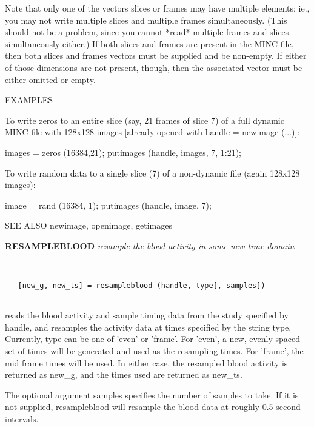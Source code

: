    Note that only one of the vectors slices or frames may have multiple
   elements; ie., you may not write multiple slices and multiple frames
   simultaneously.  (This should not be a problem, since you cannot *read*
   multiple frames and slices simultaneously either.)  If both slices
   and frames are present in the MINC file, then both slices and frames
   vectors must be supplied and be non-empty.  If either of those 
   dimensions are not present, though, then the associated vector must
   be either omitted or empty.  
 
   EXAMPLES
     
     To write zeros to an entire slice (say, 21 frames of slice 7) of
     a full dynamic MINC file with 128x128 images [already opened with
     handle = newimage (...)]:
 
       images = zeros (16384,21);
       putimages (handle, images, 7, 1:21);
 
     To write random data to a single slice (7) of a non-dynamic file 
     (again 128x128 images):
 
       image = rand (16384, 1);
       putimages (handle, image, 7);
 
   SEE ALSO  newimage, openimage, getimages
\endfunchelp


{\large\bf RESAMPLEBLOOD} {\em  resample the blood activity in some new time domain}
\begin{verbatim}


   [new_g, new_ts] = resampleblood (handle, type[, samples])


\end{verbatim}

   reads the blood activity and sample timing data from the study
   specified by handle, and resamples the activity data at times
   specified by the string type.  Currently, type can be one of 'even'
   or 'frame'.  For 'even', a new, evenly-spaced set of times will be
   generated and used as the resampling times.  For 'frame', the mid
   frame times will be used.  In either case, the resampled blood
   activity is returned as new\_g, and the times used are returned as
   new\_ts.
 
   The optional argument samples specifies the number of samples
   to take.  If it is not supplied, resampleblood will resample the
   blood data at roughly 0.5 second intervals.
\endfunchelp


